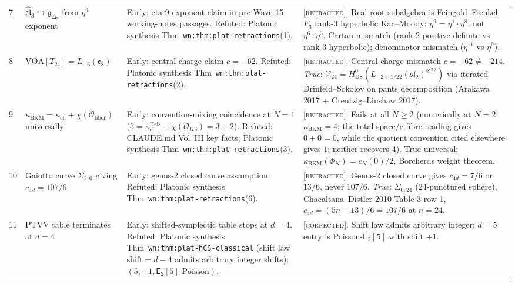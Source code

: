 \documentclass[11pt]{article}
\theoremstyle{definition}
\theoremstyle{remark}
\providecommand{\cO}{\mathcal{O}}
\providecommand{\fg}{\mathfrak{g}}
\providecommand{\Etwo}{\mathsf{E}_2}
\providecommand{\kch}{\kappa_{\mathrm{ch}}}
\providecommand{\kBKM}{\kappa_{\mathrm{BKM}}}
\providecommand{\cV}{\mathcal{V}}
\providecommand{\ClaimStatusCorrected}{\textsc{[corrected]}}
\providecommand{\ClaimStatusRetracted}{\textsc{[retracted]}}
\begin{document}
\begin{longtable}{@{}p{0.7cm}p{4.8cm}p{4.4cm}p{4.8cm}@{}}
7 & $\widehat{\mathfrak{sl}}_3\hookrightarrow\fg_{\Delta_5}$ from
$\eta^9$ exponent
& Early: eta-9 exponent claim in pre-Wave-15 working-notes passages.
Refuted: Platonic synthesis
Thm~\texttt{wn:thm:plat-retractions}(1).
& \ClaimStatusRetracted. Real-root subalgebra is Feingold--Frenkel
$F_3$ rank-3 hyperbolic Kac--Moody; $\eta^9 = \eta^1\cdot\eta^8$, not
$\eta^6\cdot\eta^3$. Cartan mismatch (rank-2 positive definite vs
rank-3 hyperbolic); denominator mismatch ($\eta^{11}$ vs $\eta^9$).
\\[0.3ex]

8 & $\mathrm{VOA}[T_{24}] = L_{-6}(\mathfrak{e}_8)$
& Early: central charge claim $c = -62$.
Refuted: Platonic synthesis
Thm~\texttt{wn:thm:plat-retractions}(2).
& \ClaimStatusRetracted. Central charge mismatch $c = -62\neq -214$.
\emph{True}: $\cV_{24} = H^0_{\mathrm{DS}}(L_{-2+1/22}(\mathfrak{sl}_2)^{\otimes
22})$ via iterated Drinfeld--Sokolov on pants decomposition
(Arakawa 2017 + Creutzig--Linshaw 2017).
\\[0.3ex]

9 & $\kBKM = \kch + \chi(\cO_{\mathrm{fiber}})$ universally
& Early: convention-mixing coincidence at $N=1$
($5 = \kch^{\mathrm{Heis}} + \chi(\cO_{K3}) = 3 + 2$).
Refuted: CLAUDE.md Vol~III key facts; Platonic synthesis
Thm~\texttt{wn:thm:plat-retractions}(3).
& \ClaimStatusRetracted. Fails at all $N\geq 2$ (numerically at $N=2$:
$\kBKM = 4$; the total-space/e-fibre reading gives $0+0=0$, while the
quotient convention cited elsewhere gives $1$; neither recovers $4$).
True universal:
$\kBKM(\Phi_N) = c_N(0)/2$, Borcherds weight theorem.
\\[0.3ex]

10 & Gaiotto curve $\Sigma_{2,0}$ giving $c_{4d} = 107/6$
& Early: genus-2 closed curve assumption.
Refuted: Platonic synthesis
Thm~\texttt{wn:thm:plat-retractions}(6).
& \ClaimStatusRetracted. Genus-2 closed curve gives $c_{4d} = 7/6$
or $13/6$, never $107/6$. \emph{True}: $\Sigma_{0,24}$
(24-punctured sphere), Chacaltana--Distler 2010 Table 3 row 1,
$c_{4d} = (5n-13)/6 = 107/6$ at $n=24$.
\\[0.3ex]

11 & PTVV table terminates at $d = 4$
& Early: shifted-symplectic table stops at $d=4$.
Refuted: Platonic synthesis
Thm~\texttt{wn:thm:plat-hCS-classical} (shift law
$\mathrm{shift} = d-4$ admits arbitrary integer shifts);
$(5, +1, \Etwo[5]\text{-Poisson})$.
& \ClaimStatusCorrected. Shift law admits arbitrary integer; $d=5$
entry is Poisson-$\Etwo[5]$ with shift $+1$.
\\[0.3ex]


\end{longtable}
\end{document}
